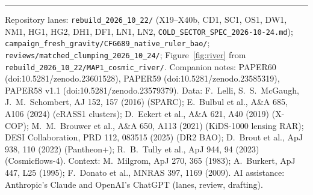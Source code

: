 \documentclass[10pt]{article}
\begin{document}
\vspace{2pt}\hrule\vspace{2pt}
{\footnotesize
Repository lanes: \texttt{rebuild\_2026\_10\_22/} (X19--X40b, CD1, SC1, OS1, DW1, NM1, HG1, HG2, DH1, DF1, LN1, LN2, \texttt{COLD\_SECTOR\_SPEC\_2026-10-24.md}); \texttt{campaign\_fresh\_gravity/CFG689\_native\_ruler\_bao/}; \texttt{reviews/matched\_clumping\_2026\_10\_24/}; Figure~\ref{fig:river} from \texttt{rebuild\_2026\_10\_22/MAP1\_cosmic\_river/}. Companion notes: PAPER60 (doi:10.5281/zenodo.23601528), PAPER59 (doi:10.5281/zenodo.23585319), PAPER58 v1.1 (doi:10.5281/zenodo.23579379).
Data: F.~Lelli, S.~S.~McGaugh, J.~M.~Schombert, AJ 152, 157 (2016) (SPARC); E.~Bulbul et al., A\&A 685, A106 (2024) (eRASS1 clusters); D.~Eckert et al., A\&A 621, A40 (2019) (X-COP); M.~M.~Brouwer et al., A\&A 650, A113 (2021) (KiDS-1000 lensing RAR); DESI Collaboration, PRD 112, 083515 (2025) (DR2 BAO); D.~Brout et al., ApJ 938, 110 (2022) (Pantheon+); R.~B.~Tully et al., ApJ 944, 94 (2023) (Cosmicflows-4).
Context: M.~Milgrom, ApJ 270, 365 (1983); A.~Burkert, ApJ 447, L25 (1995); F.~Donato et al., MNRAS 397, 1169 (2009).
AI assistance: Anthropic's Claude and OpenAI's ChatGPT (lanes, review, drafting).}
\end{document}
